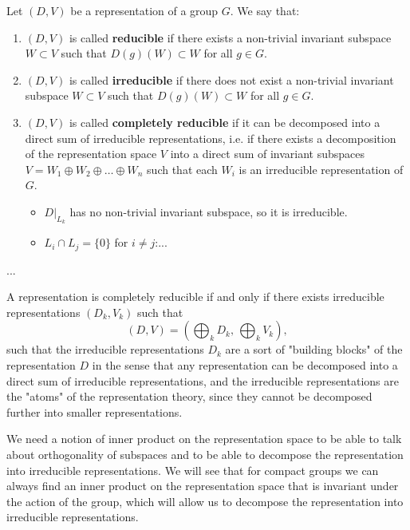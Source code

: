 \begin{definition}
    Let \((D,V)\) be a representation of a group \(G\). We say that:
    \begin{enumerate}
        \item \((D,V)\) is called \textbf{reducible} if there exists a non-trivial invariant subspace \(W \subset V\) such that \(D(g)(W) \subset W\) for all \(g \in G\).
        \item \((D,V)\) is called \textbf{irreducible} if there does not exist a non-trivial invariant subspace \(W \subset V\) such that \(D(g)(W) \subset W\) for all \(g \in G\).
        \item \((D,V)\) is called \textbf{completely reducible} if it can be decomposed into a direct sum of irreducible representations, i.e. if there exists a decomposition of the representation space \(V\) into a direct sum of invariant subspaces \(V = W_1 \oplus W_2 \oplus \dots \oplus W_n\) such that each \(W_i\) is an irreducible representation of \(G\).
              \begin{itemize}
                  \item \(D |_{L_k}\) has no non-trivial invariant subspace, so it is irreducible.
                  \item \(L_i \cap L_j = \{0\}\) for \(i \neq j\):...
              \end{itemize}
    \end{enumerate}
    ...
\end{definition}

\begin{proposition}
    A representation is completely reducible if and only if there exists irreducible representations \((D_k, V_k)\) such that
    \[
        (D,V) = \left(\bigoplus_k D_k, \, \bigoplus_k V_k\right),
    \]
    such that the irreducible representations \(D_k\) are a sort of "building blocks" of the representation \(D\) in the sense that any representation can be decomposed into a direct sum of irreducible representations, and the irreducible representations are the "atoms" of the representation theory, since they cannot be decomposed further into smaller representations.
\end{proposition}

We need a notion of inner product on the representation space to be able to talk about orthogonality of subspaces and to be able to decompose the representation into irreducible representations. We will see that for compact groups we can always find an inner product on the representation space that is invariant under the action of the group, which will allow us to decompose the representation into irreducible representations.

